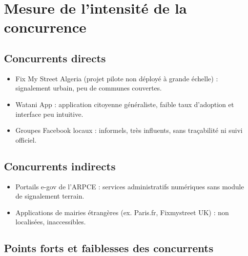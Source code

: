 \documentclass[12pt,a4paper]{report}
\begin{document}
\section{Mesure de l'intensité de la concurrence}

\subsection{Concurrents directs}
\begin{itemize}
  \item Fix My Street Algeria (projet pilote non déployé à grande échelle) :
        signalement urbain, peu de communes couvertes.
  \item Watani App : application citoyenne généraliste, faible taux d'adoption
        et interface peu intuitive.
  \item Groupes Facebook locaux : informels, très influents, sans traçabilité
        ni suivi officiel.
\end{itemize}

\subsection{Concurrents indirects}
\begin{itemize}
  \item Portails e-gov de l'ARPCE : services administratifs numériques sans
        module de signalement terrain.
  \item Applications de mairies étrangères (ex. Paris.fr, Fixmystreet UK) :
        non localisées, inaccessibles.
\end{itemize}

\subsection{Points forts et faiblesses des concurrents}
\end{document}
